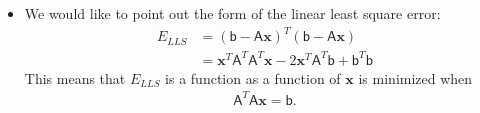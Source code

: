 \documentclass[10pt]{article}
\newcommand{\ve}[1]{\mathbf{#1}}
\newcommand{\msf}[1]{\mathsf{#1}}
\begin{document}
\begin{itemize}
    \item We would like to point out the form of the linear least square
      error:
      \begin{align*}
        E_{LLS} 
        &= (\msf{b} - \msf{A}\ve{x})^T(\msf{b} - \msf{A}\ve{x})\\
        &= \ve{x}^T \msf{A}^T \msf{A}^T \ve{x} 
          - 2 \ve{x}^T \msf{A}^T \msf{b} + \msf{b}^T \msf{b}
      \end{align*}
      This means that $E_{LLS}$ is a function as a function of $\ve{x}$
      is minimized when
      \begin{align*}
        \msf{A}^T \msf{A} \ve{x} = \msf{b}.
      \end{align*}

  \end{itemize}  
  
\end{document}
